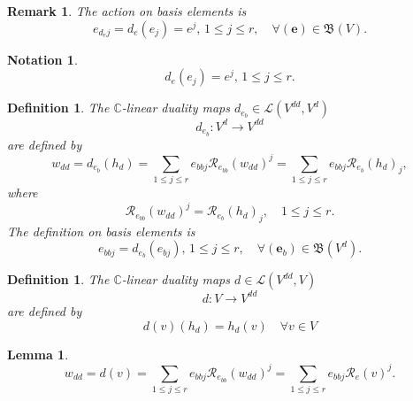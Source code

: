 \documentclass[aps,preprint]{revtex4}
\newtheorem{definition}[theorem]{Definition}
\newtheorem{lemma}[theorem]{Lemma}
\newtheorem{notation}[theorem]{Notation}
\newtheorem{remark}[theorem]{Remark}
\begin{document}
\begin{remark}
The action on basis elements is 
\begin{equation}
e_{d_{e}j}=d_{e}\left( e_{j}\right) =e^{j},\,1\leq j\leq r,\quad \forall
\left( \boldsymbol{e}\right) \in \mathfrak{B}\left( V\right) .
\end{equation}
\end{remark}

\begin{notation}
\begin{equation}
d_{e}\left( e_{j}\right) =e^{j},\,1\leq j\leq r.
\end{equation}
\end{notation}

\begin{definition}
The $\mathbb{C}$-linear duality maps $d_{e_{b}}\in \mathcal{L}\left(
V^{dd},V^{d}\right) $ 
\begin{equation}
d_{e_{b}}:V^{d}\rightarrow V^{dd}
\end{equation}%
are defined by 
\begin{equation}
w_{dd}=d_{e_{b}}\left( h_{d}\right) =\sum_{1\leq j\leq r}e_{bbj}\mathcal{R}%
_{e_{bb}}\left( w_{dd}\right) ^{j}=\sum_{1\leq j\leq r}e_{bbj}\mathcal{R}%
_{e_{b}}\left( h_{d}\right) _{j},
\end{equation}%
where 
\begin{equation}
\mathcal{R}_{e_{bb}}\left( w_{dd}\right) ^{j}=\mathcal{R}_{e_{b}}\left(
h_{d}\right) _{j},\quad 1\leq j\leq r.
\end{equation}%
The definition on basis elements is 
\begin{equation}
e_{bbj}=d_{e_{b}}\left( e_{bj}\right) ,\,1\leq j\leq r,\quad \forall \left( 
\boldsymbol{e}_{b}\right) \in \mathfrak{B}\left( V^{d}\right) .
\end{equation}
\end{definition}

\begin{definition}
The $\mathbb{C}$-linear duality maps $d\in \mathcal{L}\left( V^{dd},V\right) 
$ 
\begin{equation}
d:V\rightarrow V^{dd}
\end{equation}%
are defined by 
\begin{equation}
d\left( v\right) \left( h_{d}\right) =h_{d}\left( v\right) \quad \forall
v\in V
\end{equation}
\end{definition}

\begin{lemma}
\begin{equation}
w_{dd}=d\left( v\right) =\sum_{1\leq j\leq r}e_{bbj}\mathcal{R}%
_{e_{bb}}\left( w_{dd}\right) ^{j}=\sum_{1\leq j\leq r}e_{bbj}\mathcal{R}%
_{e}\left( v\right) ^{j}.
\end{equation}
\end{lemma}
\end{document}
